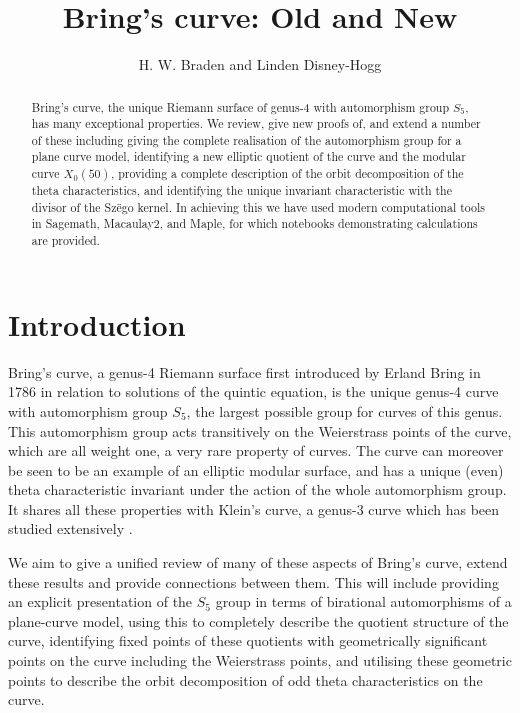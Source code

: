 \documentclass{amsart}
\title{Bring's curve: Old and New}
\author{H. W. Braden and Linden Disney-Hogg}
\begin{document}
\maketitle

\begin{abstract}
    Bring's curve, the unique Riemann surface of genus-4 with automorphism group $S_5$, has many exceptional properties.
    We review, give new proofs of, and extend a number of these including giving the complete realisation of the automorphism group for a plane curve model, identifying a new elliptic quotient of the curve and the modular curve $X_0(50)$, providing a complete description of the orbit decomposition of the theta characteristics, and identifying the unique invariant characteristic with the divisor of the Sz\"ego kernel. In achieving this we have used modern computational tools in Sagemath, Macaulay2, and Maple, for which notebooks demonstrating calculations are provided.

\end{abstract}
\section{Introduction}
Bring's curve, a genus-4 Riemann surface first introduced by Erland Bring in 1786 in relation to solutions of the quintic equation, is the unique genus-4 curve with automorphism group $S_5$, the largest possible group for curves of this genus. This automorphism group acts transitively on the Weierstrass points of the curve, which are all weight one, a very rare property of curves. The curve can moreover be seen to be an example of an elliptic modular surface, and has a unique (even) theta characteristic invariant under the action of the whole automorphism group. It shares all these properties with Klein's curve, a genus-3 curve which has been studied extensively \cite{Levy2001}. 

We aim to give a unified review of many of these aspects of Bring's curve, extend these results and provide connections between them.
This will include providing an explicit presentation of the $S_5$ group in terms of birational automorphisms of a plane-curve model, using this to completely describe the quotient structure of the curve, identifying fixed points of these quotients with geometrically significant points on the curve including the Weierstrass points, and utilising these geometric points to describe the orbit decomposition of odd theta characteristics on the curve. 
\end{document}
